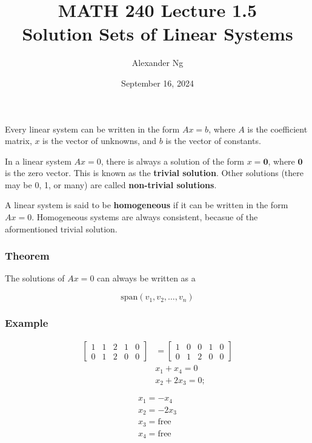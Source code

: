 \documentclass[12pt]{article}
\begin{document}
\title{MATH 240 Lecture 1.5\\Solution Sets of Linear Systems}
\author{Alexander Ng}
\date{September 16, 2024}

\maketitle

Every linear system can be written in the form $Ax=b$, where $A$ is the
coefficient matrix, $x$ is the vector of unknowns, and $b$ is the vector of
constants.

In a linear system $Ax=0$, there is always a solution of the form $x=\mathbf{0}$,
where $\mathbf{0}$ is the zero vector. This is known as the \textbf{trivial
solution}. Other solutions (there may be 0, 1, or many) are called 
\textbf{non-trivial solutions}.

A linear system is said to be \textbf{homogeneous} if it can be written in the
form $Ax=0$. Homogeneous systems are always consistent, becasue of the
aformentioned trivial solution.


\subsubsection*{Theorem}
The solutions of $Ax=0$ can always be written as a 

\begin{equation*}
  \text{span}(v_1, v_2, \dots, v_n)
\end{equation*}

\subsubsection*{Example}

\begin{align*}
  \begin{bmatrix}
    1 & 1 & 2 & 1 & 0 \\
    0 & 1 & 2 & 0 & 0
  \end{bmatrix}
  &=
  \begin{bmatrix}
    1 & 0 & 0 & 1 & 0 \\
    0 & 1 & 2 & 0 & 0
  \end{bmatrix}\\
  &x_1 + x_4 = 0 \\ 
  &x_2 + 2x_3 = 0;
\end{align*}

\begin{align*}
x_1 = -x_4\\
x_2 = -2x_3\\
x_3 = \text{free}\\
x_4 = \text{free}\\
\end{align*}
\end{document}
